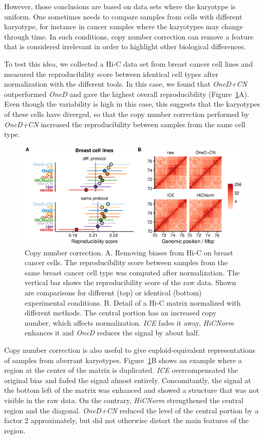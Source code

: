 \documentclass[a4,center,fleqn]{NAR}
\providecommand{\DIFadd}[1]{{\protect\color{red}#1}} %
\providecommand{\DIFdel}[1]{{\protect}}                      %
\providecommand{\DIFaddbegin}{} %
\providecommand{\DIFaddend}{} %
\providecommand{\DIFdelbegin}{} %
\providecommand{\DIFdelend}{} %
\providecommand{\DIFaddFL}[1]{\DIFadd{#1}} %
\providecommand{\DIFdelFL}[1]{\DIFdel{#1}} %
\providecommand{\DIFaddbeginFL}{} %
\providecommand{\DIFaddendFL}{} %
\providecommand{\DIFdelbeginFL}{} %
\providecommand{\DIFdelendFL}{} %
\begin{document}
However, those conclusions are based on data sets where the karyotype is
uniform. One sometimes needs to compare samples from cells with different
karyotype, for instance in cancer samples where the karyotypes may change
through time. In such conditions, copy number correction can remove a
feature that is considered irrelevant in order to highlight other
biological differences.

To test this idea, we collected a Hi-C data set from breast cancer cell
lines and measured the reproducibility score between identical cell types
after normalization with the different tools. In this case, we found that
\textit{OneD+CN} outperformed \textit{OneD} and gave the highest overall
reproducibility (Figure~\ref{fig:cnv_correction}A). Even though the
variability is high in this case, this suggests that the karyotypes of
these cells have diverged, so that the copy number correction performed by
\textit{OneD\DIFaddbegin \DIFadd{+CN}\DIFaddend } increased the reproducibility between samples from the same
cell type.

\begin{figure}
\centerline{\includegraphics[width=.49\textwidth]{figure_4.eps}}
\caption{Copy number correction. A. Removing biases from Hi-C on breast
cancer cells. The reproducibility score between samples from the same
breast cancer cell type was computed after normalization. The vertical bar
shows the reproducibility score of the raw data. Shown are comparisons for
different (top) or identical (bottom) experimental conditions. B. Detail
of a Hi-C matrix normalized with different methods. The central portion
has an increased copy number, which affects normalization. \textit{ICE}
fades it away, \DIFdelbeginFL \textit{\DIFdelFL{LGF}} %
\DIFdelendFL \DIFaddbeginFL \textit{\DIFaddFL{HiCNorm}} \DIFaddendFL enhances it and \textit{OneD} reduces the
signal by about half.}
\label{fig:cnv_correction}
\end{figure}

Copy number correction is also useful to give euploid-equivalent
representations of samples from aberrant karyotypes.
Figure~\ref{fig:cnv_correction}B shows an example where a region at the
center of the matrix is duplicated. \textit{ICE} overcompensated the
original bias and faded the signal almost entirely. Concomitantly, the
signal at the bottom left of the matrix was enhanced and showed a
structure that was not visible in the raw data. On the contrary,
\textit{\DIFdelbegin \DIFdel{LGF}\DIFdelend \DIFaddbegin \DIFadd{HiCNorm}\DIFaddend } strengthened the central region and the diagonal.
\textit{OneD\DIFaddbegin \DIFadd{+CN}\DIFaddend } reduced the level of the central portion by a factor 2
approximately, but did not otherwise distort the main features of the
region.
\end{document}
